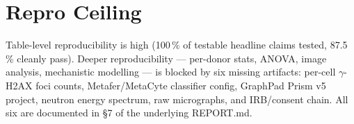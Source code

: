 \documentclass[11pt]{article}
\begin{document}
\section{Repro Ceiling}
Table-level reproducibility is high (100\,\% of testable headline claims tested,
87.5\,\% cleanly pass). Deeper reproducibility --- per-donor stats, ANOVA,
image analysis, mechanistic modelling --- is blocked by six missing artifacts:
per-cell $\gamma$-H2AX foci counts, Metafer/MetaCyte classifier config,
GraphPad Prism v5 project, neutron energy spectrum, raw micrographs, and
IRB/consent chain. All six are documented in \S7 of the underlying REPORT.md.
\end{document}
